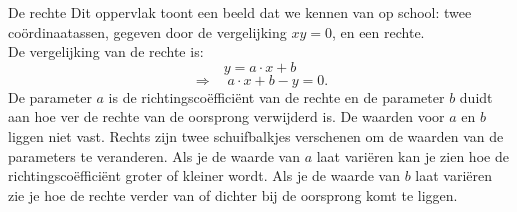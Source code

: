 \begin{surferPage}[Rechte]{De rechte}
Dit oppervlak toont een beeld dat we kennen van op school: twee co\"ordinaatassen, gegeven door de vergelijking $xy=0$, en een rechte. \\De vergelijking van de rechte is:
\[y=a\cdot x + b\]
\[ \Rightarrow \quad a\cdot x +b -y=0.\]
De parameter $a$ is de richtingsco\"effici\"ent van de rechte en de parameter $b$ duidt aan hoe ver de rechte van de oorsprong verwijderd is.
\newline \newline
De waarden voor $a$ en $b$ liggen niet vast. Rechts zijn twee schuifbalkjes verschenen om de waarden van de parameters te veranderen. Als je de waarde van $a$ laat vari\"eren kan je zien hoe de richtingsco\"effici\"ent groter of kleiner wordt. Als je de waarde van $b$ laat vari\"eren zie je hoe de rechte verder van of dichter bij de oorsprong komt te liggen.
\end{surferPage}
